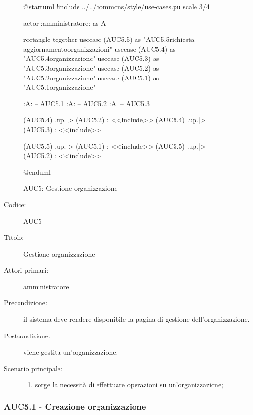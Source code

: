 \documentclass[../../../analisi-dei-requisiti.tex]{subfiles}
\begin{document}
\begin{figure}[h!]
  \centering
  \begin{plantuml}
  @startuml
  !include ../../commons/style/use-cases.pu
  scale 3/4

  actor :amministratore: as A

  rectangle {
    together {
      usecase (AUC5.5) as "AUC5.5\nInvio richiesta aggiornamento\nlista organizzazioni"
      usecase (AUC5.4) as "AUC5.4\nSeleziona organizzazione"
      usecase (AUC5.3) as "AUC5.3\nModifica organizzazione"
      usecase (AUC5.2) as "AUC5.2\nEliminazione organizzazione"
      usecase (AUC5.1) as "AUC5.1\nCreazione organizzazione"
    }
  }

  :A: -- AUC5.1
  :A: -- AUC5.2
  :A: -- AUC5.3

  (AUC5.4) .up.|> (AUC5.2) : <<include>>
  (AUC5.4) .up.|> (AUC5.3) : <<include>>

  (AUC5.5) .up.|> (AUC5.1) : <<include>>
  (AUC5.5) .up.|> (AUC5.2) : <<include>>

  @enduml
  \end{plantuml}
  \caption{AUC5: Gestione organizzazione}
  \label{fig:AUC5}
\end{figure}

\begin{description}
  \item[Codice:] AUC5
  \item[Titolo:] Gestione organizzazione
  \item[Attori primari:] amministratore
  \item[Precondizione:] il sistema deve rendere disponibile la pagina di gestione dell'organizzazione.
  \item[Postcondizione:] viene gestita un'organizzazione.
  \item[Scenario principale:]
  \begin{enumerate}
    \item sorge la necessità di effettuare operazioni su un'organizzazione;
  \end{enumerate}
\end{description}

\subsubsection{AUC5.1 - Creazione organizzazione}%
  \label{subsub:AUC5.1}
\end{document}
